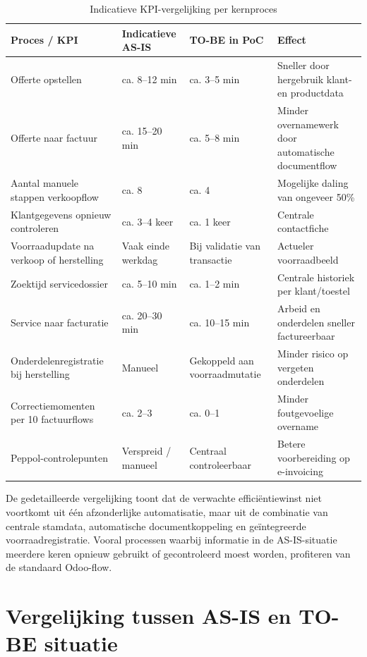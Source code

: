 \begin{table}[H]
\centering
\caption{Indicatieve KPI-vergelijking per kernproces}
\label{tab:kpi-detailprocessen}
\begin{tabular}{|p{4cm}|p{3cm}|p{3cm}|p{3cm}|}
\hline
\textbf{Proces / KPI} & \textbf{Indicatieve AS-IS} & \textbf{TO-BE in PoC} & \textbf{Effect} \\
\hline
Offerte opstellen & ca. 8--12 min & ca. 3--5 min & Sneller door hergebruik klant- en productdata \\
\hline
Offerte naar factuur & ca. 15--20 min & ca. 5--8 min & Minder overnamewerk door automatische documentflow \\
\hline
Aantal manuele stappen verkoopflow & ca. 8 & ca. 4 & Mogelijke daling van ongeveer 50\% \\
\hline
Klantgegevens opnieuw controleren & ca. 3--4 keer & ca. 1 keer & Centrale contactfiche \\
\hline
Voorraadupdate na verkoop of herstelling & Vaak einde werkdag & Bij validatie van transactie & Actueler voorraadbeeld \\
\hline
Zoektijd servicedossier & ca. 5--10 min & ca. 1--2 min & Centrale historiek per klant/toestel \\
\hline
Service naar facturatie & ca. 20--30 min & ca. 10--15 min & Arbeid en onderdelen sneller factureerbaar \\
\hline
Onderdelenregistratie bij herstelling & Manueel & Gekoppeld aan voorraadmutatie & Minder risico op vergeten onderdelen \\
\hline
Correctiemomenten per 10 factuurflows & ca. 2--3 & ca. 0--1 & Minder foutgevoelige overname \\
\hline
Peppol-controlepunten & Verspreid / manueel & Centraal controleerbaar & Betere voorbereiding op e-invoicing \\
\hline
\end{tabular}
\end{table}

De gedetailleerde vergelijking toont dat de verwachte efficiëntiewinst niet voortkomt uit één afzonderlijke automatisatie, maar uit de combinatie van centrale stamdata, automatische documentkoppeling en geïntegreerde voorraadregistratie. Vooral processen waarbij informatie in de AS-IS-situatie meerdere keren opnieuw gebruikt of gecontroleerd moest worden, profiteren van de standaard Odoo-flow.

\section{Vergelijking tussen AS-IS en TO-BE situatie}
\label{sec:asis-tobe}

